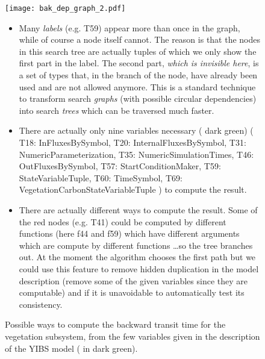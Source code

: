 \begin{figure}[ht]
	\texttt{[image: bak\_dep\_graph\_2.pdf]}
    \caption{
      Possible ways to compute the backward transit time for the vegetation
      subsystem, from the few variables given in the description of the YIBS
      model ( in dark green).
    }
    \begin{itemize}
      \item
      Many \emph{labels} (e.g. T59)  appear more than once in the graph, while of
        course a node itself cannot.  The reason is that the nodes in this
        search tree are actually tuples of which we only show the first part in
        the label. The second part, \emph{which is invisible here}, is a set of
        types that, in the branch of the node, have already been used and are not
        allowed anymore.  This is a standard technique to transform search
        \emph{graphs} (with possible circular dependencies) into search
        \emph{trees} which can be traversed much faster.
      \item
        There are actually only nine variables necessary ( dark green)
        (
          T18: InFluxesBySymbol, 
        	T20: InternalFluxesBySymbol, 
        	T31: NumericParameterization, 
        	T35: NumericSimulationTimes, 
        	T46: OutFluxesBySymbol, 
        	T57: StartConditionMaker, 
        	T59: StateVariableTuple, 
        	T60: TimeSymbol, 
        	T69: VegetationCarbonStateVariableTuple
       ) to compute the result.
      \item
        There are actually different ways to compute the result. Some of the red nodes (e.g. T41)         could be computed by different functions (here f44 and f59)  which have different arguments which are compute by different functions \dots so the tree branches out. 
        At the moment the algorithm chooses the first path but we could use this feature to
        remove hidden duplication in the model description (remove some of the given variables since they are computable) and 
        if it is unavoidable to automatically test its consistency. 
    \end{itemize}
  \label{fig:dep_graph_2}
\end{figure}
